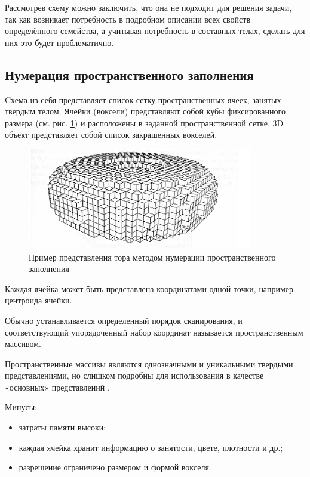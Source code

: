 Рассмотрев схему можно заключить, что она не подходит для решения задачи, так как возникает потребность в подробном описании
всех свойств определённого семейства, а учитывая потребность в составных телах, сделать для них это будет проблематично.

\subsection{Нумерация пространственного заполнения} \label{numeric_scheme}
Cхема из себя представляет список-сетку пространственных ячеек, занятых твердым телом.
Ячейки (воксели) представляют собой кубы фиксированного размера (см. рис. \ref{fig:spatial_occupacy}) и расположены в заданной пространственной сетке. 
3D объект представляет собой список закрашенных вокселей.
\begin{figure}
  \centering
  \includegraphics[scale=1.2]{inc/img/spatial_occupacy}
  \caption{Пример представления тора методом нумерации пространственного заполнения}
  \label{fig:spatial_occupacy}
\end{figure}

Каждая ячейка может быть представлена ​​координатами одной точки, например центроида ячейки.

Обычно устанавливается определенный порядок сканирования, и соответствующий упорядоченный набор координат называется пространственным массивом.

Пространственные массивы являются однозначными и уникальными твердыми представлениями, но слишком подробны для использования в качестве «основных» представлений \cite{lecture_solid_modeling}.

Минусы:  
\begin{itemize} 
\item затраты памяти высоки;
\item каждая ячейка хранит информацию о занятости, цвете, плотности и др.;
\item разрешение ограничено размером и формой вокселя.
\end{itemize}

